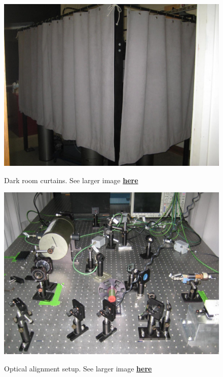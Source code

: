 \documentclass{../lab}
\begin{document}
\begin{figure}[h]
\begin{minipage}{0.32\textwidth}
    \href{http://experimentationlab.berkeley.edu/sites/default/files/IMG\_4080.JPG}{\includegraphics[width=\linewidth,keepaspectratio]{images/IMG_4080.JPG}}
    \caption{Dark room curtains. See larger image \href{http://experimentationlab.berkeley.edu/sites/default/files/IMG\_4080.JPG}{\textbf{here}}}
\end{minipage}
\begin{minipage}{0.32\textwidth}
    \href{http://experimentationlab.berkeley.edu/sites/default/files/IMG\_4083.JPG}{\includegraphics[width=\linewidth,keepaspectratio]{images/IMG_4083.JPG}}
    \caption{Optical alignment setup. See larger image \href{http://experimentationlab.berkeley.edu/sites/default/files/IMG\_4083.JPG}{\textbf{here}}}

\end{minipage}
\end{figure}
\end{document}
